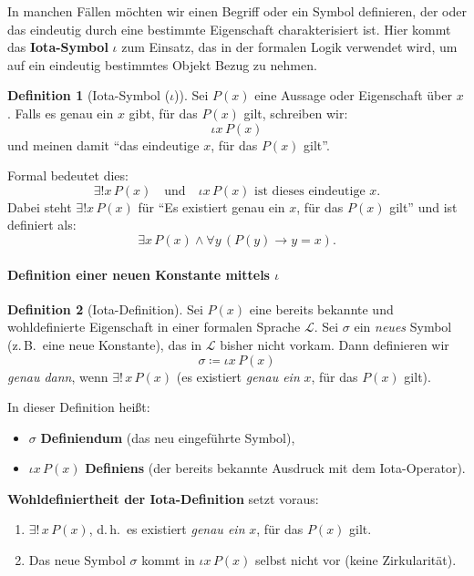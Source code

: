 \documentclass{book}
\theoremstyle{plain}
\theoremstyle{remark}
\theoremstyle{definition}
\newtheorem{definition}{Definition}[section]
\begin{document}
In manchen Fällen möchten wir einen Begriff oder ein Symbol definieren, der oder das eindeutig durch eine bestimmte Eigenschaft charakterisiert ist. Hier kommt das \textbf{Iota-Symbol} \( \iota \) zum Einsatz, das in der formalen Logik verwendet wird, um auf ein eindeutig bestimmtes Objekt Bezug zu nehmen.

\begin{definition}[Iota-Symbol (\( \iota \))]
Sei \( P(x) \) eine Aussage oder Eigenschaft über \( x \). Falls es genau ein \( x \) gibt, für das \( P(x) \) gilt, schreiben wir:
\[
\iota x \, P(x)
\]
und meinen damit \enquote{das eindeutige \( x \), für das \( P(x) \) gilt}.

Formal bedeutet dies:
\[
\exists! x \, P(x) \quad \text{und} \quad \iota x \, P(x) \text{ ist dieses eindeutige } x.
\]
Dabei steht \( \exists! x \, P(x) \) für \enquote{Es existiert genau ein \( x \), für das \( P(x) \) gilt} und ist definiert als:
\[
\exists x \, P(x) \land \forall y \, (P(y) \rightarrow y = x).
\]
\end{definition}

\paragraph{Definition einer neuen Konstante mittels \(\iota\)}

\begin{definition}[Iota-Definition]
Sei \(P(x)\) eine bereits bekannte und wohldefinierte Eigenschaft in einer formalen Sprache \(\mathcal{L}\). Sei \(\sigma\) ein \emph{neues} Symbol (z.\,B.\ eine neue Konstante), das in \(\mathcal{L}\) bisher nicht vorkam. Dann definieren wir
\[
\sigma \coloneqq \iota x\,P(x)
\]
\emph{genau dann}, wenn \(\exists!\,x\,P(x)\) (es existiert \emph{genau ein} \(x\), für das \(P(x)\) gilt). 

\noindent
In dieser Definition heißt:
\begin{itemize}
    \item \(\sigma\) \textbf{Definiendum} (das neu eingeführte Symbol),
    \item \(\iota x\,P(x)\) \textbf{Definiens} (der bereits bekannte Ausdruck mit dem Iota-Operator).
\end{itemize}

\noindent
\textbf{Wohldefiniertheit der Iota-Definition} setzt voraus:
\begin{enumerate}
    \item \(\exists!\,x\,P(x)\), d.\,h.\ es existiert \emph{genau ein} \(x\), für das \(P(x)\) gilt.
    \item Das neue Symbol \(\sigma\) kommt in \(\iota x\,P(x)\) selbst nicht vor (keine Zirkularität).
\end{enumerate}
\end{definition}
\end{document}
